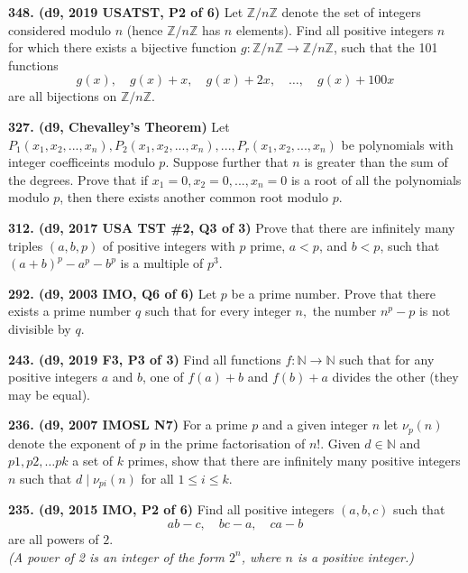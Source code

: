 \documentclass{article}
\begin{document}
\textbf{348. (\color{red}d9\color{black}, 2019 USATST, P2 of 6)} Let $\mathbb{Z}/n\mathbb{Z}$ denote the set of integers considered modulo $n$ (hence $\mathbb{Z}/n\mathbb{Z}$ has $n$ elements). Find all positive integers $n$ for which there exists a bijective function $g: \mathbb{Z}/n\mathbb{Z} \to \mathbb{Z}/n\mathbb{Z}$, such that the 101 functions
\[g(x), \quad g(x) + x, \quad g(x) + 2x, \quad \dots, \quad g(x) + 100x\]are all bijections on $\mathbb{Z}/n\mathbb{Z}$.


\textbf{327. (\color{red}d9\color{black}, Chevalley's Theorem)} Let $P_1(x_1, x_2, ..., x_n), P_2(x_1, x_2, ..., x_n), ..., P_r(x_1, x_2, ..., x_n)$ be polynomials with integer coefficeints modulo $p$. Suppose further that $n$ is greater than the sum of the degrees. Prove that if $x_1 = 0, x_2 = 0, ..., x_n = 0$ is a root of all the polynomials modulo $p$, then there exists another common root modulo $p$.

\textbf{312. (\color{red}d9\color{black}, 2017 USA TST \#2, Q3 of 3)}
Prove that there are infinitely many triples $(a, b, p)$ of positive integers
with $p$ prime, $a < p$, and $b < p$, such that $(a + b)^p - a^p - b^p$ is a
multiple of $p^3$.

\textbf{292. (\color{red}d9\color{black}, 2003 IMO, Q6 of 6)} Let $p$ be a prime number. Prove that there exists a prime number $q$ such that for every integer $n,$ the number $n^{p} - p$ is not divisible by $q.$

\textbf{243. (\color{red}d9\color{black}, 2019 F3, P3 of 3)} Find all functions $f:\mathbb{N}\to\mathbb{N}$ such that for any positive integers $a$ and $b$, one of $f(a) + b$ and $f(b) + a$ divides the other (they may be equal).

\textbf{236. (\color{red}d9\color{black}, 2007 IMOSL N7)} For a prime $p$ and a given integer $n$ let $\nu_{p} (n)$ denote the exponent of $p$ in the prime factorisation of $n!.$ Given $d \in \mathbb{N}$ and ${p{1}, p{2}, \dots p{k}}$ a set of $k$ primes, show that there are infinitely many positive integers $n$ such that $d \mid \nu_{p{i}}(n)$ for all $1 \leq i \leq k.$

\textbf{235. (\color{red}d9\color{black}, 2015 IMO, P2 of 6)} Find all positive integers \((a,b,c)\) such that \[ab-c,\quad bc-a,\quad ca-b\] are all powers of \(2\).\\[10pt]



\textit{(A power of 2 is an integer of the form \(2^n\), where \(n\) is a positive integer.)}
\end{document}
